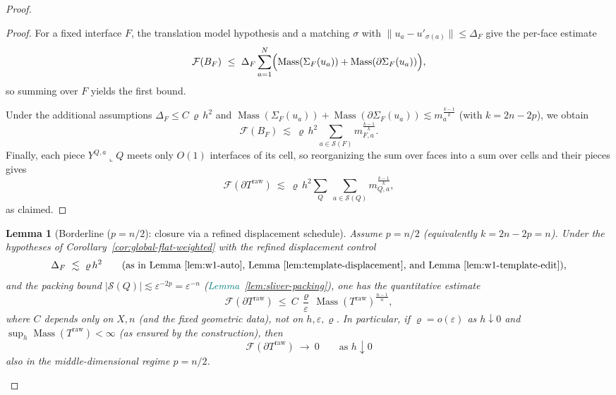 \documentclass[11pt]{article}
\newcommand{\REVMZ}[1]{\textcolor{teal}{#1}}  %
\numberwithin{equation}{section}  %
\theoremstyle{plain}
\newtheorem{lemma}[theorem]{Lemma}
\theoremstyle{definition}
\theoremstyle{remark}
\DeclareMathOperator{\Mass}{Mass}
\begin{document}
\begin{proof}
\begin{proof}
For a fixed interface $F$, the translation model hypothesis and a matching $\sigma$ with
$\|u_a-u'_{\sigma(a)}\|\le \Delta_F$ give the per-face estimate
\[
\mathcal F(B_F)\ \le\ \Delta_F\sum_{a=1}^N \Bigl(\Mass(\Sigma_F(u_a))+\Mass(\partial\Sigma_F(u_a))\Bigr),
\]
so summing over $F$ yields the first bound.

Under the additional assumptions $\Delta_F\le C\,\varrho\,h^2$ and
$\Mass(\Sigma_F(u_a))+\Mass(\partial\Sigma_F(u_a))\lesssim m_a^{\frac{k-1}{k}}$ (with $k=2n-2p$),
we obtain
\[
\mathcal F(B_F)\ \lesssim\ \varrho\,h^2\sum_{a\in\mathcal S(F)} m_{F,a}^{\frac{k-1}{k}}.
\]
Finally, each piece $Y^{Q,a}\llcorner Q$ meets only $O(1)$ interfaces of its cell, so reorganizing the sum over faces into a sum over
cells and their pieces gives
\[
\mathcal F\!\left(\partial T^{\mathrm{raw}}\right)
\ \lesssim\ \varrho\,h^2\sum_Q\ \sum_{a\in\mathcal S(Q)} m_{Q,a}^{\frac{k-1}{k}},
\]
as claimed.
\end{proof}


\begin{lemma}[Borderline ($p=n/2$): closure via a refined displacement schedule]\label{lem:borderline-p-half}
Assume $p=n/2$ (equivalently $k=2n-2p=n$).
Under the hypotheses of Corollary~\ref{cor:global-flat-weighted} with the \emph{refined} displacement control
\[
\Delta_F\ \lesssim\ \varrho\,h^{2}
\qquad\text{(as in Lemma~\ref{lem:w1-auto}, Lemma~\ref{lem:template-displacement}, and Lemma~\ref{lem:w1-template-edit}),}
\]
and the packing bound $|\mathcal S(Q)|\lesssim \varepsilon^{-2p}=\varepsilon^{-n}$ (\REVMZ{Lemma~\ref{lem:sliver-packing}}),
one has the quantitative estimate
\[
\mathcal F(\partial T^{\mathrm{raw}})\ \le\ C\,\frac{\varrho}{\varepsilon}\,\Mass(T^{\mathrm{raw}})^{\frac{n-1}{n}},
\]
where $C$ depends only on $X,n$ (and the fixed geometric data), not on $h,\varepsilon,\varrho$.
In particular, if $\varrho=o(\varepsilon)$ as $h\downarrow 0$ and $\sup_h \Mass(T^{\mathrm{raw}})<\infty$ (as ensured by the construction),
then
\[
\mathcal F(\partial T^{\mathrm{raw}})\ \longrightarrow\ 0
\qquad\text{as }h\downarrow 0
\]
also in the middle-dimensional regime $p=n/2$.
\end{lemma}


\end{proof}
\end{document}
